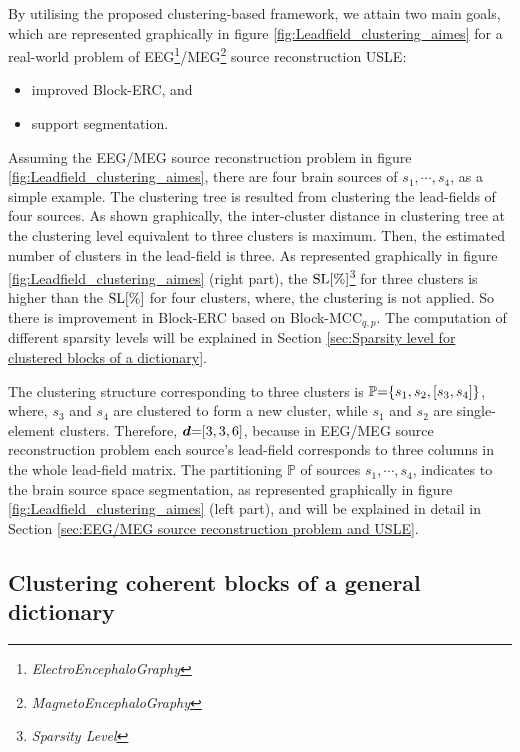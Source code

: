 By utilising the proposed clustering-based framework, we attain two main goals, which are represented graphically in figure \ref{fig:Leadfield_clustering_aimes} for a real-world problem of EEG\footnote{\emph{ElectroEncephaloGraphy}}/MEG\footnote{\emph{MagnetoEncephaloGraphy}} source reconstruction USLE:
\begin{itemize}
\item improved Block-ERC, and
\item support segmentation.
\end{itemize}

Assuming the EEG/MEG source reconstruction problem in figure \ref{fig:Leadfield_clustering_aimes}, there are four brain sources of $s_1, \cdots , s_4$, as a simple example. 
The clustering tree is resulted from clustering the lead-fields of four sources.
As shown graphically, the inter-cluster distance in clustering tree at the clustering level equivalent to three clusters is maximum.
Then, the estimated number of clusters in the lead-field is three.
As represented graphically in figure \ref{fig:Leadfield_clustering_aimes} (right part), the $\mathrm{SL}[\%]$\footnote{\emph{Sparsity Level}} for three clusters is higher than the $\mathrm{SL}[\%]$ for four clusters, where, the clustering is not applied.
So there is improvement in Block-ERC based on Block-MCC$_{q,p}$.
The computation of different sparsity levels will be explained in Section \ref{sec:Sparsity level for clustered blocks of a dictionary}.

The clustering structure corresponding to three clusters is $\mathbb{P} {=} \{ s_1 , s_2 , [s_3 , s_4 ] \} $, where, $s_3$ and $s_4$ are clustered to form a new cluster, while $s_1$ and $s_2$ are single-element clusters. 
Therefore, $\boldsymbol{d} {=} [3, 3, 6]$, because in EEG/MEG source reconstruction problem each source's lead-field corresponds to three columns in the whole lead-field matrix.
The partitioning $\mathbb{P}$ of sources $s_1, \cdots , s_4$, indicates to the brain source space segmentation, as represented graphically in figure \ref{fig:Leadfield_clustering_aimes} (left part), and will be explained in detail in Section \ref{sec:EEG/MEG source reconstruction problem and USLE}.

\FloatBarrier
\subsection{Clustering coherent blocks of a general dictionary}
